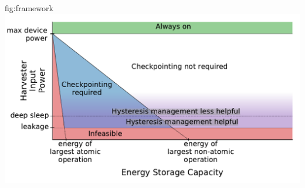 \begin{definefigure}{fig:framework}
  \centering
  \includegraphics[width=\columnwidth]{figs/capacity/harvesting_framework/framework}
  \caption{
  \normalfont Design space for energy harvesting sensors based on their energy
  income (which we assume is constant for this analysis), energy storage capacity, and workload.
  Workload is represented by the largest atomic/non-atomic operations supported
  by a design, as well as the deep sleep and leakage power.  The plot breaks
  into four regions: \textbf{1)} always
  on or effectively powered, \textbf{2)} Infeasible due to lack of energy storage or
  leakage higher than harvesting rate \textbf{3)} Feasible but requires checkpointing
  to make forward progress, and \textbf{4)} Enough energy storage to not require
  or benefit from checkpointing. Additionally, sensors which have high
  power when they enter deep sleep before depleting their
  energy buffer may benefit from hysteresis management techniques.
  This benefit diminishes with lower sleep currents and higher harvesting potential.
  }
\end{definefigure}

